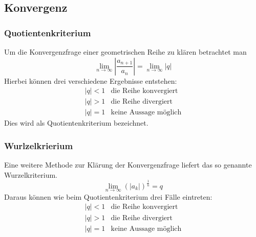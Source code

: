 \subsection{Konvergenz}

\subsubsection*{Quotientenkriterium}
Um die Konvergenzfrage einer geometrischen Reihe zu klären betrachtet man
\[\boxed{ \lim\limits_{n \rightarrow \infty} \left| \frac{a_{n+1}}{a_n} \right| = \lim\limits_{n \rightarrow \infty} \left| q \right|} \]
Hierbei können drei verschiedene Ergebnisse entstehen:
\[ \boxed{\begin{array}{ll}
|q| < 1 & \text{die Reihe konvergiert} \\
|q| > 1 & \text{die Reihe divergiert} \\
|q| = 1 & \text{keine Aussage möglich}
\end{array}} \]
Dies wird als Quotientenkriterium bezeichnet.

\subsubsection*{Wurlzelkrierium}
Eine weitere Methode zur Klärung der Konvergenzfrage liefert das so genannte Wurzelkriterium.
\[\boxed{ \lim\limits_{n \rightarrow \infty} \left( |a_k| \right)^{\frac{1}{n}} = q }\]
Daraus können wie beim Quotientenkriterium drei Fälle eintreten:
\[ \boxed{\begin{array}{ll}
|q| < 1 & \text{die Reihe konvergiert} \\
|q| > 1 & \text{die Reihe divergiert} \\
|q| = 1 & \text{keine Aussage möglich} 
\end{array}} \]


\ifti
